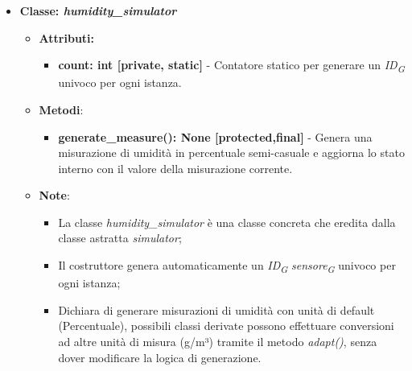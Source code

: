 \begin{itemize}
    \item{\textbf{Classe: \textit{humidity\_simulator}}}
    \begin{itemize}
        \item\textbf{Attributi:}
        \begin{itemize}
            \item \textbf{count: int [private, static]} - Contatore statico per generare un \textit{ID}\textsubscript{\textit{G}} univoco per ogni istanza.
        \end{itemize}
        \item \textbf{Metodi}: 
        \begin{itemize}
            \item \textbf{generate\_measure(): None [protected,final]} - Genera una misurazione di umidità in percentuale semi-casuale e aggiorna lo stato interno con il valore della misurazione corrente.
        \end{itemize}
        \item \textbf{Note}:
        \begin{itemize}
        \item La classe \textit{humidity\_simulator} è una classe concreta che eredita dalla classe astratta \textit{simulator};
        \item Il costruttore genera automaticamente un \textit{ID}\textsubscript{\textit{G}} \textit{sensore}\textsubscript{\textit{G}} univoco per ogni istanza;
        \item Dichiara di generare misurazioni di umidità con unità di default (Percentuale), possibili classi derivate possono effettuare conversioni ad altre unità di misura (g/m³) tramite il metodo \textit{adapt()}, senza dover modificare la logica di generazione.
        \end{itemize}
    \end{itemize}


\end{itemize}
